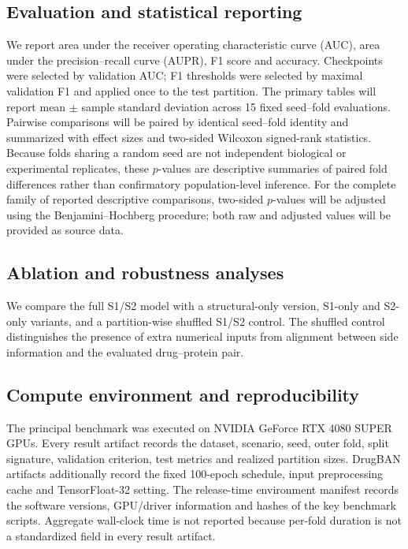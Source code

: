 \subsection{Evaluation and statistical reporting}
We report area under the receiver operating characteristic curve (AUC), area
under the precision--recall curve (AUPR), F1 score and accuracy. Checkpoints
were selected by validation AUC; F1 thresholds were selected by maximal
validation F1 and applied once to the test partition. The primary tables will
report mean $\pm$ sample standard deviation across 15 fixed seed--fold
evaluations. Pairwise comparisons will be paired by identical seed--fold
identity and summarized with effect sizes and two-sided Wilcoxon signed-rank
statistics. Because folds sharing a random seed are not independent biological
or experimental replicates, these $p$-values are descriptive summaries of
paired fold differences rather than confirmatory population-level inference.
For the complete family of reported descriptive comparisons, two-sided
$p$-values will be adjusted using the Benjamini--Hochberg procedure; both raw
and adjusted values will be provided as source data.

\subsection{Ablation and robustness analyses}
We compare the full S1/S2 model with a structural-only version, S1-only and
S2-only variants, and a partition-wise shuffled S1/S2 control. The shuffled
control distinguishes the presence of extra numerical inputs from alignment
between side information and the evaluated drug--protein pair.


\subsection{Compute environment and reproducibility}
The principal benchmark was executed on NVIDIA GeForce RTX 4080 SUPER GPUs. Every
result artifact records the dataset, scenario, seed, outer fold, split
signature, validation criterion, test metrics and realized partition sizes.
DrugBAN artifacts additionally record the fixed 100-epoch schedule, input
preprocessing cache and TensorFloat-32 setting. The release-time environment
manifest records the software versions, GPU/driver information and hashes of
the key benchmark scripts. Aggregate wall-clock time is not reported because
per-fold duration is not a standardized field in every result artifact.
